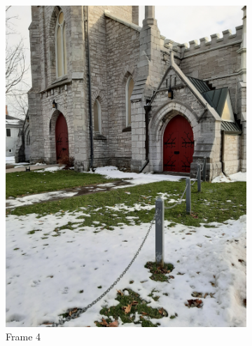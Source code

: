 \documentclass[conference]{IEEEtran}
\begin{document}
\begin{figure}[!h]
\begin{subfigure}[b]{0.2\linewidth}
    \includegraphics[width=\linewidth, angle = -90]{images/frame4.jpg}
    \caption{Frame 4}
  \end{subfigure}
  \begin{subfigure}[b]{0.2\linewidth}

\end{subfigure}
\end{figure}
\end{document}
